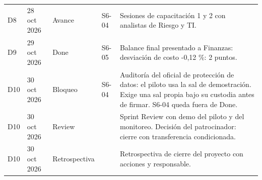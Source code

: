 \begin{tabularx}{\linewidth}{l l l l X}
D8 & 28 oct 2026 & Avance & S6-04 & Sesiones de capacitación 1 y 2 con analistas de Riesgo y TI. \\
D9 & 29 oct 2026 & Done & S6-05 & Balance final presentado a Finanzas: desviación de costo -0,12 \%: 2 puntos. \\
D10 & 30 oct 2026 & Bloqueo & S6-04 & Auditoría del oficial de protección de datos: el piloto usa la sal de demostración. Exige una sal propia bajo su custodia antes de firmar. S6-04 queda fuera de Done. \\
D10 & 30 oct 2026 & Review &  & Sprint Review con demo del piloto y del monitoreo. Decisión del patrocinador: cierre con transferencia condicionada. \\
D10 & 30 oct 2026 & Retrospectiva &  & Retrospectiva de cierre del proyecto con acciones y responsable. \\
\bottomrule
\end{tabularx}
